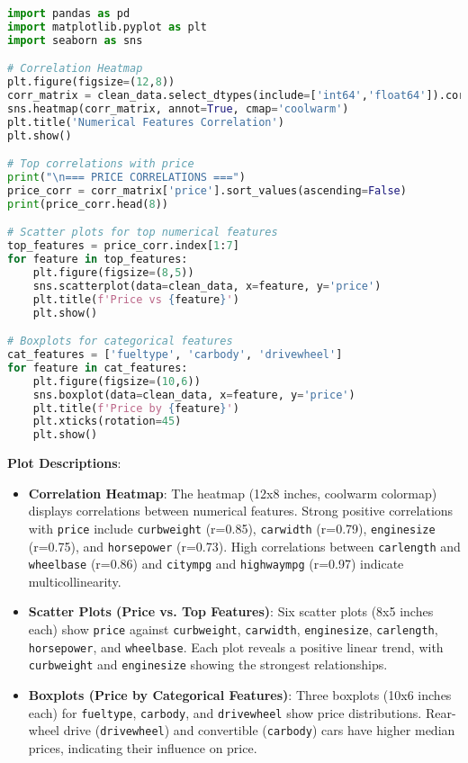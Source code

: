 \documentclass[12pt]{article}
\begin{document}
\begin{lstlisting}[language=Python, caption=EDA Code]
import pandas as pd
import matplotlib.pyplot as plt
import seaborn as sns

# Correlation Heatmap
plt.figure(figsize=(12,8))
corr_matrix = clean_data.select_dtypes(include=['int64','float64']).corr()
sns.heatmap(corr_matrix, annot=True, cmap='coolwarm')
plt.title('Numerical Features Correlation')
plt.show()

# Top correlations with price
print("\n=== PRICE CORRELATIONS ===")
price_corr = corr_matrix['price'].sort_values(ascending=False)
print(price_corr.head(8))

# Scatter plots for top numerical features
top_features = price_corr.index[1:7]
for feature in top_features:
    plt.figure(figsize=(8,5))
    sns.scatterplot(data=clean_data, x=feature, y='price')
    plt.title(f'Price vs {feature}')
    plt.show()

# Boxplots for categorical features
cat_features = ['fueltype', 'carbody', 'drivewheel']
for feature in cat_features:
    plt.figure(figsize=(10,6))
    sns.boxplot(data=clean_data, x=feature, y='price')
    plt.title(f'Price by {feature}')
    plt.xticks(rotation=45)
    plt.show()
\end{lstlisting}

\textbf{Plot Descriptions}:
\begin{itemize}
    \item \textbf{Correlation Heatmap}: The heatmap (12x8 inches, coolwarm colormap) displays correlations between numerical features. Strong positive correlations with \texttt{price} include \texttt{curbweight} (r=0.85), \texttt{carwidth} (r=0.79), \texttt{enginesize} (r=0.75), and \texttt{horsepower} (r=0.73). High correlations between \texttt{carlength} and \texttt{wheelbase} (r=0.86) and \texttt{citympg} and \texttt{highwaympg} (r=0.97) indicate multicollinearity.
    \item \textbf{Scatter Plots (Price vs. Top Features)}: Six scatter plots (8x5 inches each) show \texttt{price} against \texttt{curbweight}, \texttt{carwidth}, \texttt{enginesize}, \texttt{carlength}, \texttt{horsepower}, and \texttt{wheelbase}. Each plot reveals a positive linear trend, with \texttt{curbweight} and \texttt{enginesize} showing the strongest relationships.
    \item \textbf{Boxplots (Price by Categorical Features)}: Three boxplots (10x6 inches each) for \texttt{fueltype}, \texttt{carbody}, and \texttt{drivewheel} show price distributions. Rear-wheel drive (\texttt{drivewheel}) and convertible (\texttt{carbody}) cars have higher median prices, indicating their influence on price.
\end{itemize}
\end{document}
